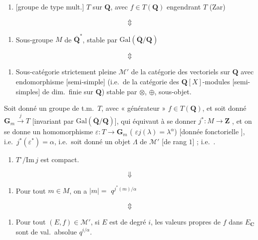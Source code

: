 \documentclass[11pt,a4paper]{article}
\begin{document}
\begin{enumerate}
  \item[a)]  [groupe de type mult.] $T$ sur $\mathbf{Q}$,
  avec $f \in T(\mathbf{Q})$ engendrant $T$ (Zar)
\end{enumerate}
\[ \Updownarrow \]
\begin{enumerate}
  \item[b)] Sous-groupe  $M$ de $\overline{\mathbf{Q}}^{*}$,
  stable par $\mathrm{Gal}(\overline{\mathbf{Q}}/\mathbf{Q})$
\end{enumerate}
\[ \Updownarrow \]
\begin{enumerate}
  \item[c)] Sous-catégorie strictement pleine $\mathcal{M}'$ de la
  catégorie des vectoriels sur $\mathbf{Q}$ avec endomorphisme
  [semi-simple] (i.e.\ de la catégorie des $\mathbf{Q}[X]$-modules
  [semi-simples] de dim.\ finie sur $\mathbf{Q}$) stable par $\otimes$,
  $\oplus$, sous-objet.
\end{enumerate}

\struck{\ill{}} Soit donné un groupe de t.m.\ $T$, avec « générateur »
$f \in T(\mathbf{Q})$, et soit donné
$\mathbf{G}_m \xrightarrow{\;j\;} T$ [invariant par
$\mathrm{Gal}(\overline{\mathbf{Q}}/\mathbf{Q})$], qui équivaut à se donner
$j^{*} : M \to \mathbf{Z}$ , et on se donne
un homomorphisme $\varepsilon : T \to \mathbf{G}_m$ (
$\varepsilon j(\lambda) = \lambda^{\alpha}$) [donnée fonctorielle
\ill{}], i.e.\ $j^{*}(\varepsilon^{*}) = \alpha$, \struck{\ill{}} i.e.\ soit
donné un objet $\Lambda$ de $\mathcal{M}'$ [de rang $1$] \ill{} ;
i.e.\ .

\begin{enumerate}
  \item[a)] $T^{\circ}/\mathrm{Im}\,j$ est compact.
\end{enumerate}
\[ \Downarrow \]
\begin{enumerate}
  \item[b)] [$q > 0$ et] Pour tout $m \in M$, on a
  $|m| =$ \struck{\ill{}} $q^{j^{*}(m)/\alpha}$
\end{enumerate}
\[ \Updownarrow \]
\begin{enumerate}
  \item[c)] [$q > 0$ et] Pour tout $(E, f) \in \mathcal{M}'$, si $E$ est de
  degré $i$, les valeurs propres de $f$ dans $E_{\mathbf{C}}$ sont de
  val.\ absolue $q^{i/\alpha}$.
\end{enumerate}
\end{document}

